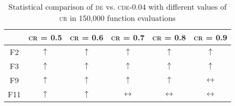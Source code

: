 \begin{table}[!t]
\caption{Statistical comparison of \textsc{de} vs. \textsc{cde}-0.04 with different values of \textsc{cr} in 150,000 function evaluations}
\label{tab:cr_stats}
\centering
\begin{scriptsize}
\begin{tabular}{c c c c c c}
\hline
               & \textsc{cr = 0.5} & \textsc{cr = 0.6} & \textsc{cr = 0.7} & \textsc{cr = 0.8} & \textsc{cr = 0.9} \\ \hline
F2             & $\uparrow$        & $\uparrow$        & $\uparrow$        & $\uparrow$        & $\uparrow$        \\ \hline
F3             & $\uparrow$        & $\uparrow$        & $\uparrow$        & $\uparrow$        & $\uparrow$        \\ \hline
F9             & $\uparrow$        & $\uparrow$        & $\uparrow$        & $\uparrow$        & $\leftrightarrow$ \\ \hline
F11            & $\uparrow$        & $\uparrow$        & $\leftrightarrow$ & $\leftrightarrow$ & $\leftrightarrow$ \\ \hline
\end{tabular}
\end{scriptsize}
\end{table}
